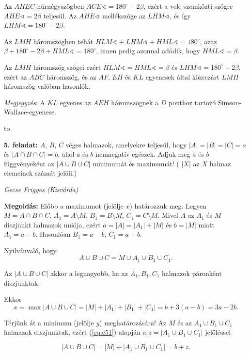\documentclass[a4paper,10pt]{article}
\newcommand{\ki}[2]{\hfill {\it #1 (#2)}\medskip}
\newcommand{\vonal}{\hbox to \hsize{\hskip2truecm\hrulefill\hskip2truecm}}
\begin{document}
Az $AHEC$ húrnégyszögben $ACE \sphericalangle = 180 ^\circ-2\beta$, ezért a vele szemközti szögre $AHE \sphericalangle = 2 \beta$ 
teljesül. Az $AHE \sphericalangle$ mellékszöge az $LHM \sphericalangle$, és így $LHM \sphericalangle = 180 ^\circ-2\beta$.

Az
$LMH$
háromszögben
tehát
$HLM \sphericalangle + LHM \sphericalangle + HML \sphericalangle = 180 ^\circ  $,
azaz
$\beta  + 180 ^\circ - 2 \beta  + HML \sphericalangle = 180 ^\circ$, innen pedig azonnal adódik, hogy $HML \sphericalangle = \beta$.

Az $LMH$ háromszög szögei ezért $HLM \sphericalangle = HML \sphericalangle = \beta$  és $LHM \sphericalangle = 180 ^\circ- 2 \beta$, ezért az $ABC$
háromszög, és az $AF$, $EH$ és $KL$ egyenesek által közrezárt $LMH$ háromszög valóban hasonlók.

\textit{Megjegyzés}: A $KL$ egyenes az $AEH$ háromszögnek a $D$ ponthoz tartozó Simson-Wallace-egyenese.
\medskip

\vonal


{\bf 5. feladat: } $A$, $B$, $C$ véges halmazok, amelyekre teljesül, 
hogy $|A|=|B|=|C|=a$ és $|A \cap B \cap C|=b$, ahol $a$ és
$b$ nemnegatív egészek. Adjuk meg $a$ és $b$ függvényeként az $|A \cup B \cup C|$ minimumát és maximumát! ( $|X|$ az $X$ halmaz elemeinek számát jelöli.)

\ki{Gecse Frigyes}{Kisvárda}\medskip

{\bf Megoldás: } Előbb a maximumot (jelölje $x$) határozzuk meg. Legyen 
$M = A \cap  B \cap  C$,
$A_1 = A \setminus  M$, $B_1 = B \setminus  M$, $C_1 = C \setminus  M$. 
Mivel $A$ az $A_1$ és $M$ diszjunkt halmazok uniója, ezért
$a = |A| = |A_1|+|M|$ és $b = |M|$ miatt $A_1 = a-b$. 
Hasonlóan $B_1 = a-b$, $C_1 = a-b$.

Nyilvánvaló, hogy
\begin{equation} \label{eq:e51}
A \cup  B \cup  C = M \cup  A_1 \cup  B_1 \cup  C_1.
\end{equation}

Az $|A \cup  B \cup  C|$ akkor a legnagyobb, 
ha az $A_1, B_1, C_1$ halmazok páronként diszjunktak.

Ekkor
$$
x = \max |A \cup  B \cup  C| = 
|M|+|A_1|+|B_1|+|C_1| = b+3(a-b)= 3a-2b.$$

Térjünk át a minimum (jelölje $y$) meghatározására! Az $M$ és az 
$A_1 \cup  B_1 \cup  C_1$ halmazok
diszjunktak, ezért (\ref{eq:e51}) alapján a 
$z = |A_1 \cup  B_1 \cup  C_1|$ jelöléssel

\begin{equation} \label{eq:e52}
|A \cup  B \cup  C| = |M|+|A_1 \cup  B_1 \cup  C_1| = b+z.
\end{equation}
\end{document}
